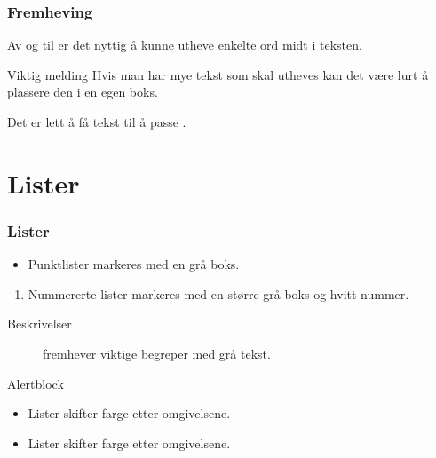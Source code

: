 \documentclass[norsk]{beamer}
\begin{document}
\begin{frame}
    \frametitle{Fremheving}
    
    Av og til er det nyttig å kunne \alert{utheve} enkelte ord midt i teksten.
    
    \begin{alertblock}{Viktig melding}     
        Hvis man har mye tekst som skal \alert{utheves} kan det være lurt å plassere den i en egen boks.
    \end{alertblock}
    
    Det er lett å få tekst til å passe .
\end{frame}

\section{Lister}

\begin{frame}
    \frametitle{Lister}
    
    \begin{itemize}
        \item Punktlister markeres med en grå boks.
    \end{itemize}
    
    \begin{enumerate}
        \item Nummererte lister markeres med en større grå boks og hvitt nummer.
    \end{enumerate}
    
    \begin{description}
        \item[Beskrivelser] fremhever viktige begreper med grå tekst.
    \end{description}
    
    \begin{alertblock}{Alertblock}
        \begin{itemize}
            \item Lister skifter farge etter omgivelsene.
        \end{itemize}        
    \end{alertblock}
    
    \begin{example}
        \begin{itemize}
            \item Lister skifter farge etter omgivelsene.
        \end{itemize}        
    \end{example}
\end{frame}
\end{document}
